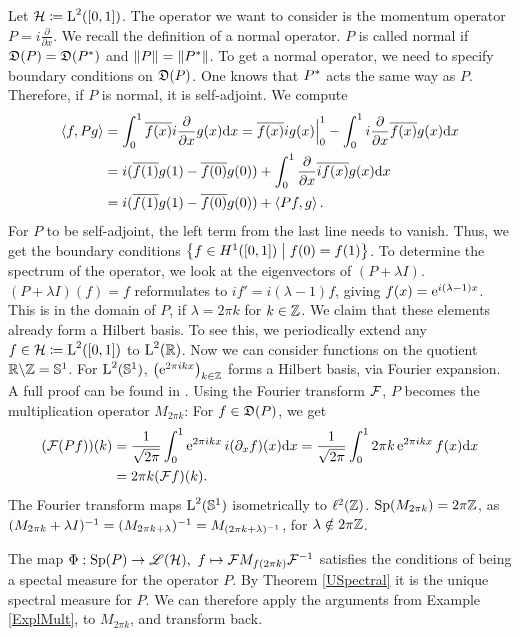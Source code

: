 \begin{expl}
 
 Let $\mathcal{H} \coloneqq \text{L}^2(\left[ 0, 1 \right])$. 
 The operator we want to consider is the momentum operator 
 $P = i \frac{\partial}{\partial x}$.
 We recall the definition of a normal operator.
 $P$ is called normal if $\mathfrak{D}(P) = \mathfrak{D}(P^{*})$ and 
 $\|P\| = \| P ^{*} \|$. To get a normal operator, we
 need to specify boundary conditions on $\mathfrak{D}(P)$. One knows that
 $P^{*}$ acts the same way as $P$. Therefore, if $P$ is normal,
 it is self-adjoint.
 We compute
 \begin{align*}
  \left\langle f, Pg \right\rangle 
 & =\int _0 ^1 \overline{f(x)} i \frac{\partial}{\partial x}g(x) \text{d}x
  = \overline{f(x)}ig(x)\Bigr|^{1}_{0}
  -\int _0 ^1 i \frac{\partial}{\partial x}\overline{f(x)} g(x) \text{d}x\\
&= i(\overline{f(1)}g(1)- \overline{f(0)}g(0))
+ \int _0 ^1 \frac{\partial}{\partial x}\overline{i f(x)} g(x) \text{d}x\\
&=i(\overline{f(1)}g(1)- \overline{f(0)}g(0)) 
+\left\langle Pf, g \right\rangle.
 \end{align*}
For $P$ to be self-adjoint, the left term from the last line needs 
to vanish. Thus, we get the boundary conditions 
 $\left\lbrace f \in H^1(\left[ 0,1 \right]) \bigm| f(0) = f(1) \right\rbrace$.
 To determine the spectrum of the operator, we look at 
 the eigenvectors of $(P+\lambda I)$.
 $(P+\lambda I)(f)=f$ reformulates to $i f' = i(\lambda - 1)f$, giving
 $f(x)= \operatorname{e}^{i(\lambda -1 )x}$. This is in the domain of $P$, if 
 $\lambda = 2\pi k$ for $k \in \mathbb{Z}$. We claim that these elements
 already form a Hilbert basis. To see this, we periodically
 extend any
 $f \in \mathcal{H} \coloneqq \text{L}^2(\left[ 0, 1 \right])$ to 
 $\text{L}^2(\mathbb{R})$. Now we can consider functions on the quotient 
 $\mathbb{R} \backslash \mathbb{Z} = \mathbb{S}^1$. For $\text{L}^2(\mathbb{S}^1)$,
 $\left(\operatorname{e}^{2\pi i k x }\right)_{k \in \mathbb{Z}}$ forms a Hilbert basis, via
 Fourier expansion. A full proof can be found in 
 \cite[Ch. V.4]{WernerFunkAna}.
 Using the Fourier transform $\mathcal{F}$, $P$ becomes the multiplication operator
 $M_{2 \pi k}$: For $f \in \mathfrak{D}(P)$, we get
 \begin{align*}
  (\mathcal{F}(Pf))(k)
  &= \frac{1}{\sqrt{2\pi}} \int _0 ^1 \operatorname{e}^{2\pi i k x}i(\partial_xf)(x)\text{d}x
  = \frac{1}{\sqrt{2\pi}} \int _0 ^1 2 \pi k \operatorname{e}^{2\pi i k x}f(x)\text{d}x \\
  &= 2 \pi k (\mathcal{F}f)(k).
 \end{align*}
The Fourier transform maps $\text{L}^2(\mathbb{S}^1)$ isometrically
to $\ell^2(\mathbb{Z})$. $\operatorname{Sp}(M_{2\pi k}) = 2\pi \mathbb{Z}$, as 
$(M_{2 \pi k } + \lambda I)^{-1} = (M_{2 \pi k + \lambda})^{-1}
= M_{(2 \pi k + \lambda)^{-1}}$, for $\lambda \notin 2\pi \mathbb{Z}$.

The map $\Phi : \operatorname{Sp}(P) \to \mathscr{L}(\mathcal{H}), ~
f \mapsto \mathcal{F}M_{f(2\pi k)} \mathcal{F}^{-1}$ satisfies the conditions
of being a spectal measure for the operator $P$. By Theorem \ref{USpectral}
it is the unique spectral measure for $P$. 
We can therefore apply the arguments from Example
\ref{ExplMult}, to $M_{2 \pi k}$, and transform back.

\end{expl}

